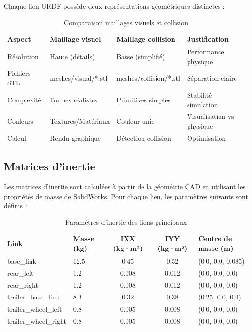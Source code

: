 \documentclass[a4paper,12pt]{report}
\begin{document}
Chaque lien URDF possède deux représentations géométriques distinctes :

\begin{table}[htbp]
\centering
\caption{Comparaison maillages visuels et collision}
\begin{tabular}{@{}llp{5cm}p{5cm}@{}}
\toprule
\textbf{Aspect} & \textbf{Maillage visuel} & \textbf{Maillage collision} & \textbf{Justification} \\
\midrule
Résolution & Haute (détails) & Basse (simplifié) & Performance physique \\
Fichiers STL & meshes/visual/*.stl & meshes/collision/*.stl & Séparation claire \\
Complexité & Formes réalistes & Primitives simples & Stabilité simulation \\
Couleurs & Textures/Matériaux & Couleur unie & Visualisation vs physique \\
Calcul & Rendu graphique & Détection collision & Optimisation \\
\bottomrule
\end{tabular}
\end{table}

\subsection{Matrices d'inertie}

Les matrices d'inertie sont calculées à partir de la géométrie CAD en utilisant les propriétés de masse de SolidWorks. Pour chaque lien, les paramètres suivants sont définis :

\begin{table}[htbp]
\centering
\caption{Paramètres d'inertie des liens principaux}
\begin{tabular}{@{}llccp{4cm}@{}}
\toprule
\textbf{Link} & \textbf{Masse (kg)} & \textbf{IXX (kg·m²)} & \textbf{IYY (kg·m²)} & \textbf{Centre de masse (m)} \\
\midrule
base\_link & 12.5 & 0.45 & 0.52 & (0.0, 0.0, 0.085) \\
rear\_left & 1.2 & 0.008 & 0.012 & (0.0, 0.0, 0.0) \\
rear\_right & 1.2 & 0.008 & 0.012 & (0.0, 0.0, 0.0) \\
trailer\_base\_link & 8.3 & 0.32 & 0.38 & (0.25, 0.0, 0.0) \\
trailer\_wheel\_left & 0.8 & 0.005 & 0.008 & (0.0, 0.0, 0.0) \\
trailer\_wheel\_right & 0.8 & 0.005 & 0.008 & (0.0, 0.0, 0.0) \\
\bottomrule
\end{tabular}
\end{table}
\end{document}
